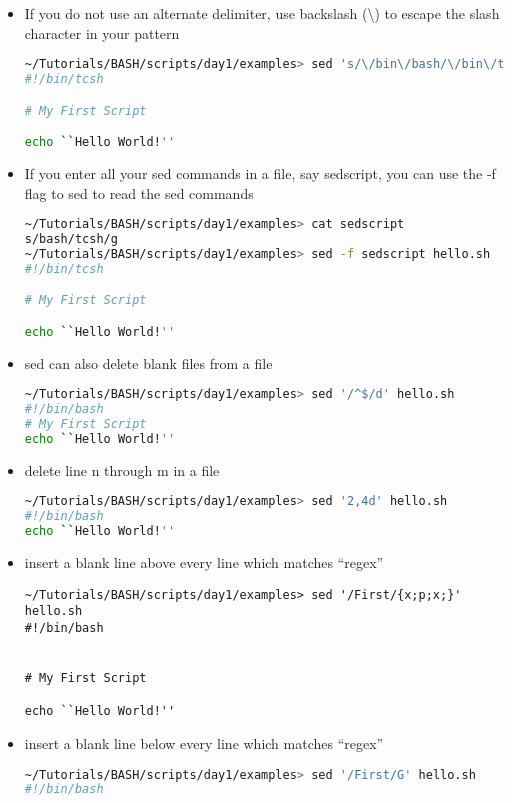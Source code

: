 \documentclass[slidestop,mathserif,compress,xcolor=svgnames]{beamer}
\begin{document}
\begin{frame}
{\begin{itemize}
\begin{lstlisting}[language=bash]
echo ``Hello World!''
      \end{lstlisting}
    \item If you do not use an alternate delimiter, use backslash (\textbackslash) to escape the slash character in your pattern
      \begin{lstlisting}[language=bash]
~/Tutorials/BASH/scripts/day1/examples> sed 's/\/bin\/bash/\/bin\/tcsh/g' hello.sh 
#!/bin/tcsh

# My First Script

echo ``Hello World!''
      \end{lstlisting}
    \item If you enter all your sed commands in a file, say sedscript, you can use the -f flag to sed to read the sed commands
      \begin{lstlisting}[language=bash]
~/Tutorials/BASH/scripts/day1/examples> cat sedscript
s/bash/tcsh/g
~/Tutorials/BASH/scripts/day1/examples> sed -f sedscript hello.sh 
#!/bin/tcsh

# My First Script

echo ``Hello World!''
      \end{lstlisting}
    \item sed can also delete blank files from a file
      \begin{lstlisting}[language=bash]
~/Tutorials/BASH/scripts/day1/examples> sed '/^$/d' hello.sh 
#!/bin/bash
# My First Script
echo ``Hello World!''
      \end{lstlisting}
    \item delete line n through m in a file
      \begin{lstlisting}[language=bash]
~/Tutorials/BASH/scripts/day1/examples> sed '2,4d' hello.sh 
#!/bin/bash
echo ``Hello World!''
      \end{lstlisting}
      \item insert a blank line above every line which matches ``regex''
        \begin{lstlisting}
~/Tutorials/BASH/scripts/day1/examples> sed '/First/{x;p;x;}' hello.sh 
#!/bin/bash


# My First Script

echo ``Hello World!''
        \end{lstlisting}
      \item insert a blank line below every line which matches ``regex''
        \begin{lstlisting}[language=bash]
~/Tutorials/BASH/scripts/day1/examples> sed '/First/G' hello.sh 
#!/bin/bash


\end{lstlisting}
\end{itemize}}
\end{frame}
\end{document}
